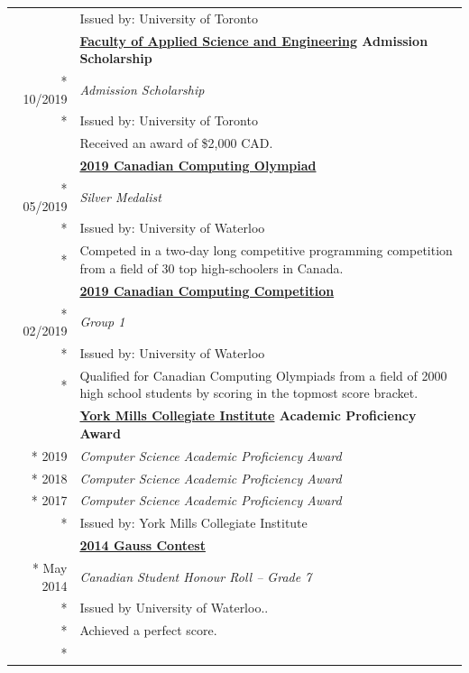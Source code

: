 \documentclass{article}
\begin{document}
\begin{tabularx}{\textwidth}{r X}
{			& {\small Issued by: University of Toronto} \\
			\addlinespace
			& \textbf{\href{https://www.engineering.utoronto.ca/}{Faculty of Applied Science and Engineering} Admission Scholarship} \\*
			10/2019 & \textit{Admission Scholarship} \\*
			& {\small Issued by: University of Toronto} \\
			& {\small Received an award of \$2,000 CAD.} \\
		}{}
		\addlinespace
		& \textbf{\href{https://www.cemc.uwaterloo.ca/contests/ccc-cco.html}{2019 Canadian Computing Olympiad}} \\*
		05/2019 & \textit{Silver Medalist} \\*
		& {\small Issued by: University of Waterloo} \\*
		& {\small Competed in a two-day long competitive programming competition from a field of 30 top high-schoolers in Canada.} \\
		\iftoggle{verbose}{
			\addlinespace
			& \textbf{\href{https://www.cemc.uwaterloo.ca/contests/ccc-cco.html}{2019 Canadian Computing Competition}} \\*
			02/2019 & \textit{Group 1} \\*
			& {\small Issued by: University of Waterloo} \\*
			& {\small Qualified for Canadian Computing Olympiads from a field of 2000 high school students by scoring in the topmost score bracket.} \\
			\addlinespace
			& \textbf{\href{https://schoolweb.tdsb.on.ca/yorkmillsci/}{York Mills Collegiate Institute} Academic Proficiency Award} \\*
			2019 & \textit{Computer Science Academic Proficiency Award} \\*
			2018 & \textit{Computer Science Academic Proficiency Award} \\*
			2017 & \textit{Computer Science Academic Proficiency Award} \\*
			& {\small Issued by: York Mills Collegiate Institute} \\
			\addlinespace
			& \textbf{\href{https://www.cemc.uwaterloo.ca/contests/gauss.html}{2014 Gauss Contest}} \\*
			May 2014 & \textit{Canadian Student Honour Roll -- Grade 7} \\*
			& {\small Issued by University of Waterloo.}. \\*
			& {\small Achieved a perfect score.} \\*
		}{}
	\end{tabularx}
\end{document}
